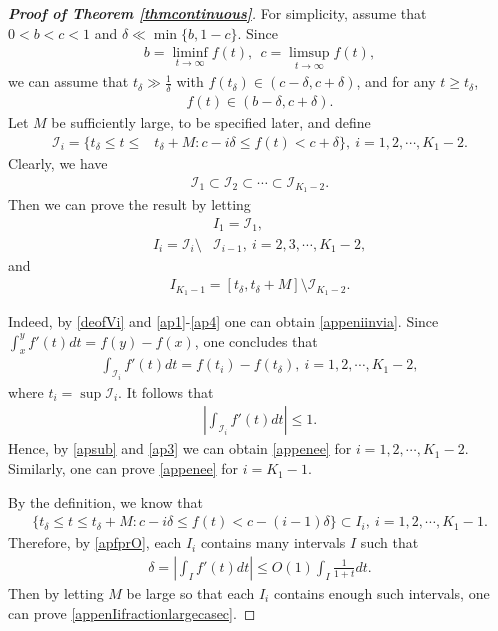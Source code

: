 \documentclass[12pt]{amsart}
\newcommand{\abs}[1]{\left\lvert #1 \right\rvert}
\theoremstyle{plain}
\theoremstyle{definition}
\begin{document}
\begin{proof}[\textbf{Proof of Theorem \ref{thmcontinuous}}]
	For simplicity, assume that $0<b<c<1$ and $\delta\ll \min\{b,1-c\}.$ 
	Since 
	\begin{align}
	b=\liminf_{t\to\infty}f(t),\ \ c=\limsup_{t\to\infty}f(t),\nonumber
	\end{align}
we can assume that $t_\delta\gg\frac{1}{\delta}$ with $f(t_\delta)\in (c-\delta,c+\delta)$, and for any $t\geq t_\delta$,
	\begin{align}
		f(t)\in (b-\delta,c+\delta).\nonumber
	\end{align}
Let $M$ be sufficiently large, to be specified later, and define
\begin{align}
	\mathcal{I}_i=\{t_\delta\leq t\leq& t_\delta+M: c-i\delta\leq f(t)<c+\delta\},\ i=1,2,\cdots,K_1-2.\label{ap1}
\end{align}Clearly, we have
\begin{align}
	\mathcal{I}_1\subset \mathcal{I}_2\subset\cdots\subset \mathcal{I}_{K_1-2}.\label{apsub}
\end{align}
Then we can prove the result by letting
\begin{align}
	&I_1=\mathcal{I}_1,\label{ap2}\\
	I_i=\mathcal{I}_i\setminus &\mathcal{I}_{i-1},\ i=2,3,\cdots,K_1-2,\label{ap3}
\end{align}
and
\begin{align}
	I_{K_1-1}=[t_\delta,t_\delta+M]\setminus \mathcal{I}_{K_1-2}.\label{ap4}
\end{align}

Indeed, by \eqref{deofVi} and \eqref{ap1}-\eqref{ap4} one can obtain \eqref{appeniinvia}. Since $\int_{x}^yf'(t)dt=f(y)-f(x)$, one concludes that
\begin{align}
	\int_{\mathcal{I}_i}f'(t)dt=f(t_i)-f(t_\delta),\nonumber\ i=1,2,\cdots,K_1-2,
\end{align}
where $t_i=\sup\mathcal{I}_i$. It follows that
\begin{align}
	\abs{\int_{\mathcal{I}_i}f'(t)dt}\leq 1.\nonumber
\end{align}
Hence, by \eqref{apsub} and \eqref{ap3} we can obtain \eqref{appenee} for $i=1,2,\cdots,K_1-2$. Similarly, one can prove \eqref{appenee} for $i=K_1-1$.

By the definition, we know that
\begin{align}
	\{t_\delta\leq t\leq t_\delta+M:c-i\delta \leq f(t)<c-(i-1)\delta\}\subset I_i,\ i=1,2,\cdots,K_1-1.\label{apfi}
\end{align}
Therefore, by \eqref{apfprO}, each $I_i$ contains many intervals $I$ such that
\begin{align}
	\delta=\abs{\int_If'(t)dt}\leq O(1)\int_I\frac{1}{1+{t}}dt.\nonumber 
\end{align}
Then by letting $M$ be large so that each $I_i$ contains enough such intervals, one can prove \eqref{appenIifractionlargecasec}.
\end{proof} 
\end{document}

